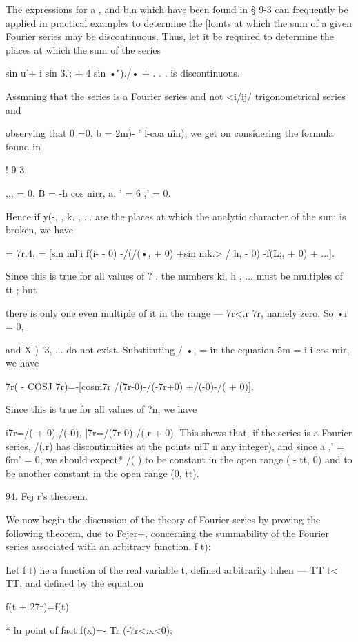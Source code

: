 The expressions for a , and b,n which have been found in § 9-3 can
frequently be applied in practical examples to determine the [loints
at which the sum of a given Fourier series may be discontinuous. Thus,
let it be required to determine the places at which the sum of the
series

sin u'+ i sin 3.'; + 4 sin •")./• + . . . is discontinuous.

  Assmning that the series is a Fourier series and not <i/ij/
trigonometrical series and

observing that 0 =0, b = 2m)- ' l-coa nin), we get on considering the
formula found in

! 9-3,

 ,,, = 0, B = -h cos nirr, a, ' = 6 ,' = 0.

Hence if y(-, , k. , ... are the places at which the analytic
character of the sum is broken, we have

= 7r.4, = [sin ml'i f(i- - 0) -/(/(•, + 0) +sin mk.> / h, - 0) -f(L;,
+ 0) + ...].

Since this is true for all values of ? , the numbers ki, h , ... must
be multiples of tt ; but

there is only one even multiple of it in the range — 7r<.r 7r, namely
zero. So •i = 0,

and X ) '3, ... do not exist. Substituting / •, = in the equation 5m =
i-i cos mir, we have

7r( - COSJ 7r)=-[cosm7r /(7r-0)-/(-7r+0) +/(-0)-/( + 0)].

Since this is true for all values of ?n, we have

i7r=/( + 0)-/(-0), |7r=/(7r-0)-/(,r + 0). This shews that, if the
series is a Fourier series, /(.r) has discontinuities at the points
niT n any integer), and since a ,' = 6m' = 0, we should expect* /( )
to be constant in the open range ( - tt, 0) and to be another constant
in the open range (0, tt).

94. Fej r's theorem.

We now begin the discussion of the theory of Fourier series by proving
the following theorem, due to Fejer+, concerning the summability of
the Fourier series associated with an arbitrary function, f t):

Let f t) he a function of the real variable t, defined arbitrarily
luhen — TT t< TT, and defined by the equation

f(t + 27r)=f(t)

* lu point of fact f(x)=- Tr (-7r<:x<0);

